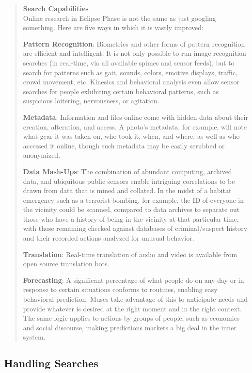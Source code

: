 \begin{quotation}
\textbf{Search Capabilities}
\\
Online research in Eclipse Phase is not the same
as just googling something. Here are five ways in
which it is vastly improved:

\textbf{Pattern Recognition}: Biometrics and other forms
of pattern recognition are efficient and intelligent.
It is not only possible to run image recognition
searches (in real-time, via all available spimes
and sensor feeds), but to search for patterns such
as gait, sounds, colors, emotive displays, traffic,
crowd movement, etc. Kinesics and behavioral
analysis even allow sensor searches for people
exhibiting certain behavioral patterns, such as suspicious
loitering, nervousness, or agitation.

\textbf{Metadata}: Information and files online come
with hidden data about their creation, alteration,
and access. A photo’s metadata, for example,
will note what gear it was taken on, who took
it, when, and where, as well as who accessed it
online, though such metadata may be easily
scrubbed or anonymized.

\textbf{Data Mash-Ups}: The combination of abundant
computing, archived data, and ubiquitous public
sensors enable intriguing correlations to be
drawn from data that is mined and collated. In
the midst of a habitat emergency such as a terrorist
bombing, for example, the ID of everyone
in the vicinity could be scanned, compared to
data archives to separate out those who have a
history of being in the vicinity at that particular
time, with those remaining checked against
databases of criminal/suspect history and their
recorded actions analyzed for unusual behavior.

\textbf{Translation}: Real-time translation of audio and
video is available from open source translation bots.

\textbf{Forecasting}: A significant percentage of what
people do on any day or in response to certain situations
conforms to routines, enabling easy behavioral
prediction. Muses take advantage of this to
anticipate needs and provide whatever is desired
at the right moment and in the right context. The
same logic applies to actions by groups of people,
such as economics and social discourse, making predictions
markets a big deal in the inner system.
\end{quotation}

\subsection{Handling Searches}

